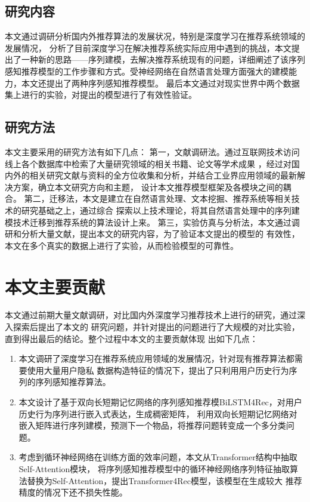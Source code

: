 \subsection{研究内容}
本文通过调研分析国内外推荐算法的发展状况，特别是深度学习在推荐系统领域的发展情况，
分析了目前深度学习在解决推荐系统实际应用中遇到的挑战，本文提出了一种新的思路——序列建模，去解决推荐系统现有的问题，详细阐述了该序列感知推荐模型的工作步骤和方式。受神经网络在自然语言处理方面强大的建模能力，本文还提出了两种序列感知推荐模型。
最后本文通过对现实世界中两个数据集上进行的实验，对提出的模型进行了有效性验证。

\subsection{研究方法}
本文主要采用的研究方法有如下几点：
第一，文献调研法。通过互联网技术访问线上各个数据库中检索了大量研究领域的相关书籍、论文等学术成果%
，经过对国内外的相关研究文献与资料的全方位收集和分析，并结合工业界应用领域的最新解决方案，确立本文研究方向和主题，%
设计本文推荐模型框架及各模块之间的耦合。
第二，迁移法，本文是建立在自然语言处理、文本挖掘、推荐系统等相关技术的研究基础之上，通过综合%
探索以上技术理论，将其自然语言处理中的序列建模技术迁移到推荐系统的算法设计上来。
第三，实验仿真与分析法，本文通过调研和分析大量文献，提出本文的研究内容，为了验证本文提出的模型的%
有效性，本文在多个真实的数据上进行了实验，从而检验模型的可靠性。

\section{本文主要贡献}
本文通过前期大量文献调研，对比国内外深度学习推荐技术上进行的研究，通过深入探索后提出了本文的%
研究问题，并针对提出的问题进行了大规模的对比实验，直到得出最后的结论。整个过程中本文的主要贡献体现%
出如下几点：
\begin{enumerate}
    \item 本文调研了深度学习在推荐系统应用领域的发展情况，针对现有推荐算法都需要使用大量用户隐私%
          数据构造特征的情况下，提出了只利用用户历史行为序列的序列感知推荐算法。
    \item 本文设计了基于双向长短期记忆网络的序列感知推荐模BiLSTM4Rec，对用户历史行为序列进行嵌入式表达，生成稠密矩阵，%
          利用双向长短期记忆网络对嵌入矩阵进行序列建模，预测下一个物品，将推荐问题转变成一个多分类问题。
    \item 考虑到循环神经网络在训练方面的效率问题，本文从Transformer结构中抽取Self-Attention模块，%
          将序列感知推荐模型中的循环神经网络序列特征抽取算法替换为Self-Attention，提出Transformer4Rec模型，该模型在生成较大%
          推荐精度的情况下还不损失性能。
\end{enumerate}


